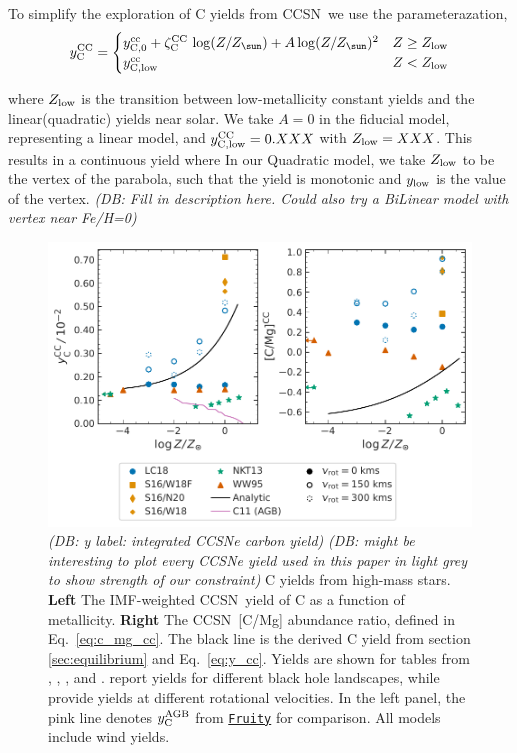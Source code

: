 \documentclass[fleqn,
usenatbib]{mnras}
\newcommand{\fruity}{\texttt{\hyperlink{fruity}{Fruity}}}
\newcommand{\cc}{CCSN}
\newcommand{\Ycc}{{y_{\rm C}^{\rm CC}}}
\newcommand{\Ycagb}{{y_{\rm C}^{\rm AGB}}}
\newcommand{\zcc}{\zeta_{\rm C}^{\rm CC}}
\newcommand{\Zo}{ Z_{\sun}}
\newcommand{\dbnote}[1]{ {\color{Thistle} \textit{\small (DB: #1)}} }
\begin{document}
To simplify the exploration of C yields from \cc\, we use the parameterazation, 
\begin{equation}\label{eq:y_cc}
    \Ycc = \begin{cases}
    y_{\rm C, 0}^{\rm cc} + \zcc\,\log(Z/\Zo) + A \log(Z/\Zo)^2 & Z \geq Z_{\rm low}
    \\
    y_{\rm C, low}^{\rm cc} & Z < Z_{\rm low}
    \end{cases}
\end{equation}

where $Z_{\rm low}$ is the transition between low-metallicity constant yields and the linear(quadratic) yields near solar. We take $A=0$ in the fiducial model, representing a linear model, and $y_{\rm C,low}^{\rm CC} = 0.XXX$ with $Z_{\rm low} = XXX$. This results in a continuous yield where 
In our Quadratic model, we take $Z_{\rm low}$ to be the vertex of the parabola, such that the yield is monotonic and $y_{\rm low}$ is the value of the vertex.
\dbnote{Fill in description here. Could also try a BiLinear model with vertex near Fe/H=0}
\begin{figure}
    \centering
    \includegraphics{cc_yields.pdf}
    \caption[]{
    \dbnote{y label: integrated CCSNe carbon yield}
    \dbnote{might be interesting to plot every CCSNe yield used in this paper in light grey to show strength of our constraint}
        C yields from high-mass stars.
        \textbf{Left} The IMF-weighted \cc\ yield of C as a function of metallicity.
        \textbf{Right} The \cc\ [C/Mg] abundance ratio, defined in Eq.~\ref{eq:c_mg_cc}. The black line is the derived C yield from section \ref{sec:equilibrium} and Eq.~\ref{eq:y_cc}. Yields are shown for tables from 
    \citet[red triangles]{WW95}, \citet[orange square and diamond]{sukhbold+16}, 
    \citet[green stars]{NKT13}, and \citet[blue circles]{LC18}. \citet{sukhbold+16} report yields for different black hole landscapes, while \citet{LC18} provide yields at different rotational velocities.
    In the left panel, the pink line denotes $\Ycagb$ from \fruity{} for comparison. All models include wind yields. 
}
    \label{fig:y_cc}
\end{figure}
\end{document}
